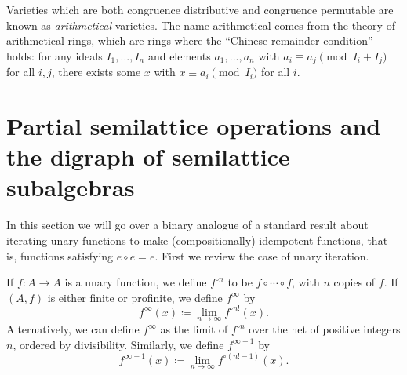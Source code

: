 \documentclass[letterpaper,11pt]{article}
\begin{document}
Varieties which are both congruence distributive and congruence permutable are known as \emph{arithmetical} varieties. The name arithmetical comes from the theory of arithmetical rings, which are rings where the ``Chinese remainder condition'' holds: for any ideals $I_1, ..., I_n$ and elements $a_1, ..., a_n$ with $a_i \equiv a_j \pmod{I_i + I_j}$ for all $i,j$, there exists some $x$ with $x \equiv a_i \pmod{I_i}$ for all $i$.


\section{Partial semilattice operations and the digraph of semilattice subalgebras}

In this section we will go over a binary analogue of a standard result about iterating unary functions to make (compositionally) idempotent functions, that is, functions satisfying $e \circ e = e$. First we review the case of unary iteration.

\begin{defn} If $f : A \rightarrow A$ is a unary function, we define $f^{\circ n}$ to be $f \circ \cdots \circ f$, with $n$ copies of $f$. If $(A,f)$ is either finite or profinite, we define $f^{\infty}$ by
\[
f^{\infty}(x) \coloneqq \lim_{n \rightarrow \infty} f^{\circ n!}(x).
\]
Alternatively, we can define $f^{\infty}$ as the limit of $f^{\circ n}$ over the net of positive integers $n$, ordered by divisibility. Similarly, we define $f^{\infty - 1}$ by
\[
f^{\infty - 1}(x) \coloneqq \lim_{n \rightarrow \infty} f^{\circ (n! - 1)}(x).
\]
\end{defn}
\end{document}
